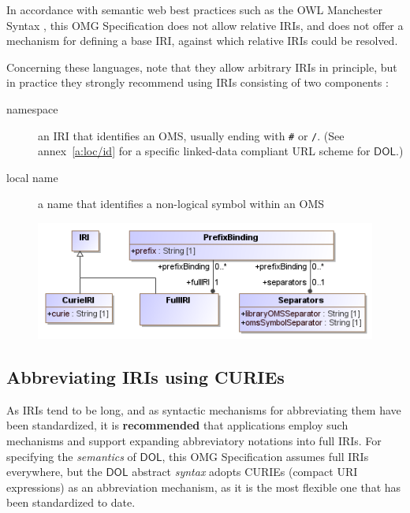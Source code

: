 \documentclass[10pt,fleqn,final]{scrreprt}
\newcommand*{\syntax}[1]{\texttt{#1}}
\newcommand*{\recommended}{\textbf{recommended}\xspace}
\newcommand*{\IS}{OMG Specification\xspace}
\newcommand*{\DOL}{\ensuremath{\mathsf{DOL}}\xspace}
\newcommand{\ssclause}[1]{\subsection{#1}}
\newenvironment{definitions}[0]{\medskip }{}
\providecommand{\DIFadd}[1]{{\protect\color{blue}\uwave{#1}}} %
\providecommand{\DIFaddbegin}{} %
\providecommand{\DIFaddend}{} %
\providecommand{\DIFdelbegin}{} %
\providecommand{\DIFdelend}{} %
\providecommand{\DIFaddFL}[1]{\DIFadd{#1}} %
\providecommand{\DIFaddbeginFL}{} %
\providecommand{\DIFaddendFL}{} %
\providecommand{\DIFdelbeginFL}{} %
\providecommand{\DIFdelendFL}{} %
\begin{document}
\begin{definitions}
In accordance with semantic web best practices such as the OWL Manchester Syntax 
\cite{W3C:NOTE-owl2-manchester-syntax-20091027}, this \IS does not allow relative IRIs, and does 
not offer a mechanism for defining a base IRI, against which relative IRIs could be resolved.

Concerning these languages, note that they allow arbitrary IRIs in principle, but in practice they 
strongly recommend using IRIs consisting of two components \cite{W3C:NOTE-swbp-vocab-pub-20080828}:
\begin{description}
\item[namespace] an IRI that identifies an OMS,
usually ending with \syntax{\#} or \syntax{/}. ({See annex~\ref{a:loc/id} for a specific linked-data compliant URL scheme for \DOL.})
\item[local name] a name that identifies a non-logical symbol within an OMS
\end{description}

\medskip
\DIFdelbegin %
\DIFdelend \DIFaddbegin \begin{figure}
  \centering
    \DIFaddendFL \includegraphics[scale=0.47]{mof/prefixes.png}
  \DIFdelbeginFL %
\DIFdelendFL \DIFaddbeginFL \caption{\DIFaddFL{DOL metamodel: Prefixes}}
  \label{fig:prefixes}
\end{figure}
\DIFaddend 



%
\ssclause{Abbreviating IRIs using CURIEs}\label{c:curies}

As IRIs tend to be long, and as syntactic mechanisms for abbreviating them have been standardized, 
it is \recommended that applications employ such mechanisms and support expanding abbreviatory
notations into full IRIs.  For specifying the \emph{semantics} of \DOL, this \IS assumes full IRIs 
everywhere, but the \DOL abstract \emph{syntax} adopts CURIEs (compact URI expressions) as an 
abbreviation mechanism, as it is the most flexible one that has been standardized to date.  


\end{definitions}
\end{document}
